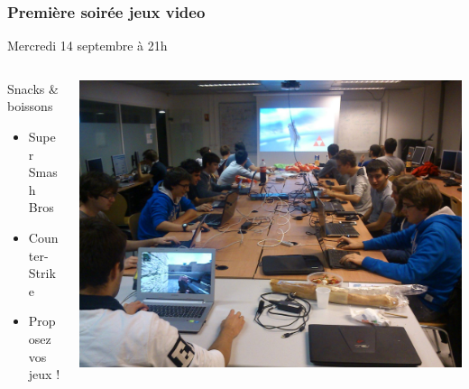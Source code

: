 \documentclass[14pt]{beamer}
\begin{document}
\begin{frame}
    \frametitle{Première soirée jeux video}

    \vspace{-2em}
    \begin{center}
        \Large Mercredi 14 septembre à 21h
    \end{center}

    \begin{columns}
        \begin{column}{.5\textwidth}
        Snacks \& boissons \\
            \begin{itemize}
                \item Super Smash Bros
                \item Counter-Strike
                \item Proposez vos jeux !
            \end{itemize}
        \end{column}
        \begin{column}{.5\textwidth}
            \includegraphics[width=\textwidth]{lan.jpg}
        \end{column}
  \end{columns}
\end{frame}
\end{document}
